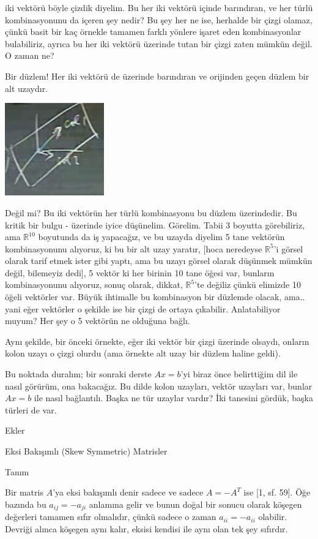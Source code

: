 \documentclass[12pt,fleqn]{article}\usepackage{../../common}
\begin{document}
iki vektörü böyle çizdik diyelim. Bu her iki vektörü içinde barındıran, ve
her türlü kombinasyonunu da içeren şey nedir? Bu şey her ne ise, herhalde
bir çizgi olamaz, çünkü basit bir kaç örnekle tamamen farklı yönlere işaret
eden kombinasyonlar bulabiliriz, ayrıca bu her iki vektörü üzerinde tutan
bir çizgi zaten mümkün değil. O zaman ne? 

Bir düzlem! Her iki vektörü de üzerinde barındıran ve orijinden geçen
düzlem bir alt uzaydır.

\includegraphics[height=4cm]{5_06.png}

Değil mi? Bu iki vektörün her türlü kombinasyonu bu düzlem üzerindedir. Bu
kritik bir bulgu - üzerinde iyice düşünelim. Görelim. Tabii 3 boyutta
görebiliriz, ama $\mathbb{R}^{10}$ boyutunda da iş yapacağız, ve bu uzayda
diyelim 5 tane vektörün kombinasyonunu alıyoruz, ki bu bir alt uzay
yaratır, [hoca neredeyse $\mathbb{R}^5$'i görsel olarak tarif etmek ister
gibi yaptı, ama bu uzayı görsel olarak düşünmek mümkün değil, bilemeyiz
dedi], 5 vektör ki her birinin 10 tane öğesi var, bunların kombinasyonunu
alıyoruz, sonuç olarak, dikkat, $\mathbb{R}^5$'te değiliz çünkü elimizde 10
öğeli vektörler var. Büyük ihtimalle bu kombinasyon bir düzlemde olacak,
ama.. yani eğer vektörler o şekilde ise bir çizgi de ortaya
çıkabilir. Anlatabiliyor muyum? Her şey o 5 vektörün ne olduğuna bağlı. 

Aynı şekilde, bir önceki örnekte, eğer iki vektör bir çizgi üzerinde
olsaydı, onların kolon uzayı o çizgi olurdu (ama örnekte alt uzay bir
düzlem haline geldi). 

Bu noktada duralım; bir sonraki derste $Ax=b$'yi biraz önce belirttiğim dil
ile nasıl görürüm, ona bakacağız. Bu dilde kolon uzayları, vektör uzayları
var, bunlar $Ax=b$ ile nasıl bağlantılı. Başka ne tür uzaylar vardır? İki
tanesini gördük, başka türleri de var. 

Ekler

Eksi Bakışımlı (Skew Symmetric) Matrisler

Tanım

Bir matris $A$'ya eksi bakışımlı denir sadece ve sadece $A = -A^T$ ise [1,  sf. 59].
Öğe bazında bu $a_{ij} = -a_{ji}$ anlamına gelir ve bunun doğal bir sonucu
olarak köşegen değerleri tamamen sıfır olmalıdır, çünkü sadece o zaman
$a_{ii} = -a_{ii}$ olabilir. Devriği alınca köşegen aynı kalır, eksisi kendisi
ile aynı olan tek şey sıfırdır.
\end{document}
